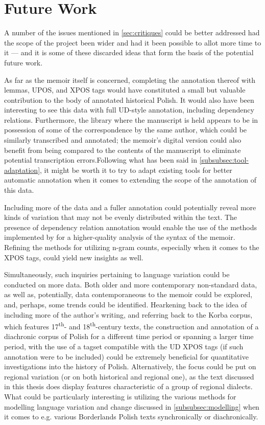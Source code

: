 \section{Future Work}
\label{sec:futurework}

A number of the issues mentioned in \autoref{sec:critiques} could be better addressed had the scope of the project been wider and had it been possible to allot more time to it --- and it is some of these discarded ideas that form the basis of the potential future work. 

As far as the memoir itself is concerned, completing the annotation thereof with lemmas, UPOS, and XPOS tags would have constituted a small but valuable contribution to the body of annotated historical Polish. It would also have been interesting to see this data with full UD-style annotation, including dependency relations. Furthermore, the library where the manuscript is held appears to be in possession of some of the correspondence by the same author, which could be similarly transcribed and annotated; the memoir's digital version could also benefit from being compared to the contents of the manuscript to eliminate potential transcription errors.Following what has been said in \autoref{subsubsec:tool-adaptation}, it might be worth it to try to adapt existing tools for better automatic annotation when it comes to extending the scope of the annotation of this data. 

Including more of the data and a fuller annotation could potentially reveal more kinds of variation that may not be evenly distributed within the text. The presence of dependency relation annotation would enable the use of the methods implemented by \citet{johannsen-etal-2015-cross} for a higher-quality analysis of the syntax of the memoir. Refining the methods for utilizing n-gram counts, especially when it comes to the XPOS tags, could yield new insights as well.

Simultaneously, such inquiries pertaining to language variation could be conducted on more data. Both older and more contemporary non-standard data, as well as, potentially, data contemporaneous to the memoir could be explored, and, perhaps, some trends could be identified. Hearkening back to the idea of including more of the author's writing, and referring back to the Korba corpus, which features 17\textsuperscript{th}- and 18\textsuperscript{th}-century texts, the construction and annotation of a diachronic corpus of Polish for a different time period or spanning a larger time period, with the use of a tagset compatible with the UD XPOS tags (if such annotation were to be included) could be extremely beneficial for quantitative investigations into the history of Polish. Alternatively, the focus could be put on regional variation (or on both historical and regional one), as the text discussed in this thesis does display features characteristic of a group of regional dialects. What could be particularly interesting is utilizing the various methods for modelling language variation and change discussed in \autoref{subsubsec:modelling} when it comes to e.g. various Borderlands Polish texts synchronically or diachronically. 

